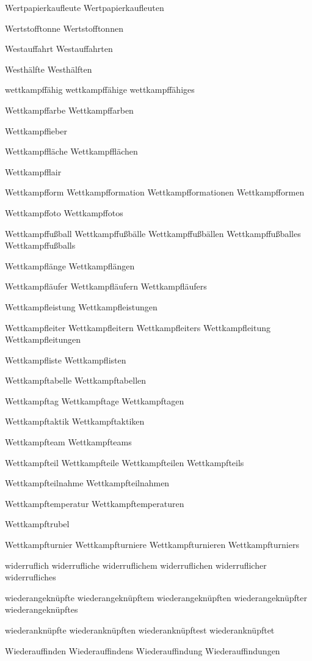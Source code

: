Wertpapierkaufleute
Wertpapierkaufleuten

Wertstofftonne
Wertstofftonnen

Westauffahrt
Westauffahrten

Westhälfte
Westhälften

wettkampffähig 
wettkampffähige 
wettkampffähiges

Wettkampffarbe
Wettkampffarben

Wettkampffieber

Wettkampffläche
Wettkampfflächen

Wettkampfflair 

Wettkampfform
Wettkampfformation
Wettkampfformationen
Wettkampfformen

Wettkampffoto
Wettkampffotos

Wettkampffußball
Wettkampffußbälle
Wettkampffußbällen
Wettkampffußballes
Wettkampffußballs

Wettkampflänge
Wettkampflängen

Wettkampfläufer
Wettkampfläufern
Wettkampfläufers

Wettkampfleistung
Wettkampfleistungen

Wettkampfleiter
Wettkampfleitern
Wettkampfleiters
Wettkampfleitung
Wettkampfleitungen

Wettkampfliste
Wettkampflisten

Wettkampftabelle
Wettkampftabellen

Wettkampftag
Wettkampftage
Wettkampftagen

Wettkampftaktik
Wettkampftaktiken

Wettkampfteam
Wettkampfteams

Wettkampfteil
Wettkampfteile
Wettkampfteilen
Wettkampfteils

Wettkampfteilnahme
Wettkampfteilnahmen

Wettkampftemperatur
Wettkampftemperaturen

Wettkampftrubel

Wettkampfturnier
Wettkampfturniere
Wettkampfturnieren
Wettkampfturniers

widerruflich
widerrufliche
widerruflichem
widerruflichen
widerruflicher
widerrufliches

wiederangeknüpfte
wiederangeknüpftem
wiederangeknüpften
wiederangeknüpfter
wiederangeknüpftes

wiederanknüpfte
wiederanknüpften
wiederanknüpftest
wiederanknüpftet

Wiederauffinden
Wiederauffindens
Wiederauffindung
Wiederauffindungen

